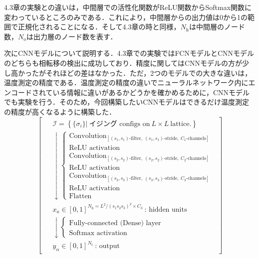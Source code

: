 \documentclass[a4paper,11pt]{jsreport}
\begin{document}
4.3章の実験との違いは，中間層での活性化関数がReLU関数からSoftmax関数に変わっているところのみである．これにより，中間層からの出力値は0から1の範囲で正規化されることになる．そして4.3章の時と同様，$N_{\text{h}}$は中間層のノード数，$N_{\text{o}}$は出力層のノード数を表す．\par
次にCNNモデルについて説明する．4.3章での実験ではFCNモデルとCNNモデルのどちらも相転移の検出に成功しており．精度に関してはCNNモデルの方が少し高かったがそれほどの差はなかった．ただ，2つのモデルでの大きな違いは，温度測定の精度である．温度測定の精度の違いでニューラルネットワーク内にエンコードされている情報に違いがあるかどうかを確かめるために，CNNモデルでも実験を行う．そのため，今回構築したいCNNモデルはできるだけ温度測定の精度が高くなるように構築した．
\begin{equation}
  \begin{bmatrix}
    \begin{aligned}
       & \mathcal{I} = \left\{ \{ \sigma_i \} \Big| \ \text{イジング configs on} \ L \times L \ \text{lattice.} \right\} \\
       & \downarrow
      \begin{cases}
        \text{Convolution}_{[(s_1,s_1)\text{-filter}, \ (s_1,s_1)\text{-stride}, \ C_1\text{-channels}]} \\
        \text{ReLU activation} \\
        \text{Convolution}_{[(s_2,s_2)\text{-filter}, \ (s_2,s_2)\text{-stride}, \ C_2\text{-channels}]} \\
        \text{ReLU activation} \\
        \text{Convolution}_{[(s_3,s_3)\text{-filter}, \ (s_3,s_3)\text{-stride}, \ C_3\text{-channels}]} \\
        \text{ReLU activation} \\
        \text{Flatten}
      \end{cases} \\
       & x_a \in [0,1]^{N_{\text{h}} = L^2/(s_1s_2s_3)^2 \times C_3} \ \text{: hidden units} \\
       & \downarrow
      \begin{cases}
        \text{Fully-connected (Dense) layer} \\
        \text{Softmax activation}
      \end{cases} \\
       & y_{\alpha} \in [0,1]^{N_t} \ \text{: output}
    \end{aligned}
  \end{bmatrix}
\end{equation} \label{conv model}
\end{document}
